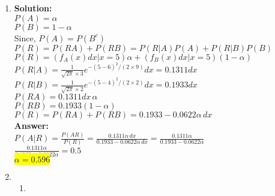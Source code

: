 \documentclass{article}
\newcommand{\myansw}{\textbf{Answer:}\\}
\newcommand{\mysolu}{\textbf{Solution:}\\}
\begin{document}
\begin{enumerate}
\begin{enumerate}
	\end{enumerate}
	\item 
	\mysolu
	${P(A) = \alpha}$\\
	${P(B) = 1-\alpha}$\\
	Since, ${P(A) = P(B^c)}$\\
	${P(R) = P(RA)+P(RB)=P(R|A)P(A)+P(R|B)P(B)}$\\
	${P(R) = (f_A(x)dx|x = 5)\alpha + (f_B(x)dx|x = 5)(1-\alpha)}$\\
	${P(R|A) = \frac{1}{\sqrt{2\pi}\times3}e^{-(5-6)^2/(2\times 9)} dx = 0.1311 dx}$\\
	${P(R|B) = \frac{1}{\sqrt{2\pi}\times2}e^{-(5-4)^2/(2\times 2)} dx = 0.1933 dx}$\\
	${P(RA) = 0.1311 dx \, \alpha}$\\
	${P(RB) = 0.1933 (1 - \alpha)}$\\
	${P(R) = P(RA)+P(RB) = 0.1933 - 0.0622 \alpha \, dx}$\\
	\myansw
	${P(A|R) = \frac{P(AR)}{P(R)}=\frac{0.1311 \alpha \,dx }{0.1933 - 0.0622  \alpha \, dx}=\frac{0.1311 \alpha  }{0.1933 - 0.0622 \alpha}}$\\
	${\frac{ 0.1311 \alpha  }{0.1933 - 0.0622 \alpha}=0.5}$\\
	\colorbox{yellow}{
		${\alpha = 0.596}$
	}\\

	\item
	\begin{enumerate}
		\item 
		
	\end{enumerate}

\end{enumerate}

\newpage
\end{document}
